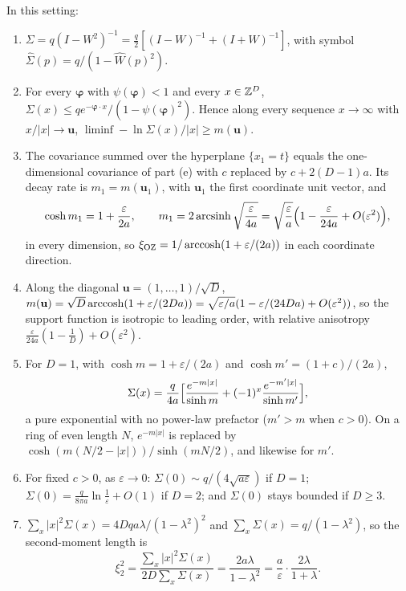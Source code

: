 \begin{theorem}\label{thm:sca-oz}
In this setting:
\begin{enumerate}
\item[(a)] $\Sigma=q(I-W^2)^{-1}=\tfrac q2[(I-W)^{-1}+(I+W)^{-1}]$, with symbol $\hat\Sigma(p)=q/(1-\hat W(p)^2)$.
\item[(b)] For every $\boldsymbol\varphi$ with $\psi(\boldsymbol\varphi)<1$ and every $x\in\mathbb{Z}^D$, $\Sigma(x)\le qe^{-\boldsymbol\varphi\cdot x}/(1-\psi(\boldsymbol\varphi)^2)$. Hence along every sequence $x\to\infty$ with $x/|x|\to\mathbf u$, $\liminf-\ln\Sigma(x)/|x|\ge m(\mathbf u)$.
\item[(c)] The covariance summed over the hyperplane $\{x_1=t\}$ equals the one-dimensional covariance of part (e) with $c$ replaced by $c+2(D-1)a$. Its decay rate is $m_1=m(\mathbf u_1)$, with $\mathbf u_1$ the first coordinate unit vector, and
\begin{equation}\label{eq:sca-oz-axis}
\cosh m_1=1+\frac{\varepsilon}{2a},\qquad m_1=2\operatorname{arcsinh}\sqrt{\frac{\varepsilon}{4a}}=\sqrt{\frac{\varepsilon}{a}}\Bigl(1-\frac{\varepsilon}{24a}+O(\varepsilon^2)\Bigr),
\end{equation}
in every dimension, so $\xi_{\mathrm{OZ}}=1/\operatorname{arccosh}(1+\varepsilon/(2a))$ in each coordinate direction.
\item[(d)] Along the diagonal $\mathbf u=(1,\dots,1)/\sqrt D$, $m(\mathbf u)=\sqrt D\operatorname{arccosh}(1+\varepsilon/(2Da))=\sqrt{\varepsilon/a}(1-\varepsilon/(24Da)+O(\varepsilon^2))$, so the support function is isotropic to leading order, with relative anisotropy $\tfrac{\varepsilon}{24a}(1-\tfrac1D)+O(\varepsilon^2)$.
\item[(e)] For $D=1$, with $\cosh m=1+\varepsilon/(2a)$ and $\cosh m'=(1+c)/(2a)$,
\begin{equation}\label{eq:sca-oz-1d}
\Sigma(x)=\frac{q}{4a}\Bigl[\frac{e^{-m|x|}}{\sinh m}+(-1)^x\frac{e^{-m'|x|}}{\sinh m'}\Bigr],
\end{equation}
a pure exponential with no power-law prefactor ($m'>m$ when $c>0$). On a ring of even length $N$, $e^{-m|x|}$ is replaced by $\cosh(m(N/2-|x|))/\sinh(mN/2)$, and likewise for $m'$.
\item[(f)] For fixed $c>0$, as $\varepsilon\to0$: $\Sigma(0)\sim q/(4\sqrt{a\varepsilon})$ if $D=1$; $\Sigma(0)=\frac{q}{8\pi a}\ln\frac1\varepsilon+O(1)$ if $D=2$; and $\Sigma(0)$ stays bounded if $D\ge3$.
\item[(g)] $\sum_x|x|^2\Sigma(x)=4Dqa\lambda/(1-\lambda^2)^2$ and $\sum_x\Sigma(x)=q/(1-\lambda^2)$, so the second-moment length is
\begin{equation}\label{eq:sca-xi2-exact}
\xi_2^2=\frac{\sum_x|x|^2\Sigma(x)}{2D\sum_x\Sigma(x)}=\frac{2a\lambda}{1-\lambda^2}=\frac a\varepsilon\cdot\frac{2\lambda}{1+\lambda}.
\end{equation}
\end{enumerate}
\end{theorem}
